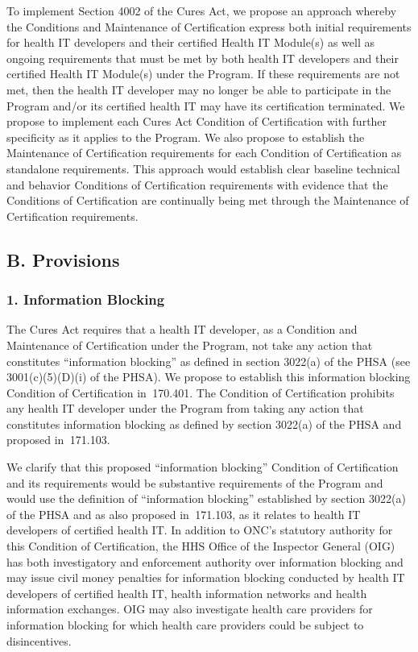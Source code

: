 \documentclass[twoside,11pt]{article}
\begin{document}
          To implement Section 4002 of the Cures Act, we propose an approach whereby the Conditions and Maintenance of Certification express both initial requirements for health IT developers and their certified Health IT Module(s) as well as ongoing requirements that must be met by both health IT developers and their certified Health IT Module(s) under the Program. If these requirements are not met, then the health IT developer may no longer be able to participate in the Program and/or its certified health IT may have its certification terminated. We propose to implement each Cures Act Condition of Certification with further specificity as it applies to the Program. We also propose to establish the Maintenance of Certification requirements for each Condition of Certification as standalone requirements. This approach would establish clear baseline technical and behavior Conditions of Certification requirements with evidence that the Conditions of Certification are continually being met through the Maintenance of Certification requirements.


          \subsection{B. Provisions}

          \subsubsection{1. Information Blocking}

          The Cures Act requires that a health IT developer, as a Condition and Maintenance of Certification under the Program, not take any action that constitutes “information blocking” as defined in section 3022(a) of the PHSA (see 3001(c)(5)(D)(i) of the PHSA). We propose to establish this information blocking Condition of Certification in \textsection{} 170.401. The Condition of Certification prohibits any health IT developer under the Program from taking any action that constitutes information blocking as defined by section 3022(a) of the PHSA and proposed in \textsection{} 171.103. 


          We clarify that this proposed “information blocking” Condition of Certification and its requirements would be substantive requirements of the Program and would use the definition of “information blocking” established by section 3022(a) of the PHSA and as also proposed in \textsection{} 171.103, as it relates to health IT developers of certified health IT. In addition to ONC's statutory authority for this Condition of Certification, the HHS Office of the Inspector General (OIG) has both investigatory and enforcement authority over information blocking and may issue civil money penalties for information blocking conducted by health IT developers of certified health IT, health information networks and health information exchanges. OIG may also investigate health care providers for information blocking for which health care providers could be subject to disincentives.
\end{document}
